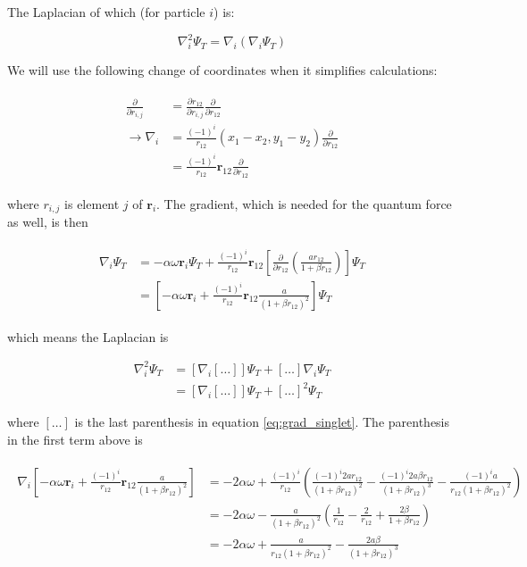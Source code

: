 \documentclass[english, a4paper]{article}
\newcommand{\bm}[1]{\mathbf{#1}}
\begin{document}
	The Laplacian of which (for particle $i$) is:
	
	\begin{equation}
	\nabla_i^2 \Psi_T = \nabla_i(\nabla_i\Psi_T)
	\end{equation}
	
	We will use the following change of coordinates when it simplifies calculations:
	
	\begin{align}
	\begin{split}
	\frac{\partial}{\partial r_{i,j}} &= \frac{\partial r_{12}}{\partial r_{i,j}}\frac{\partial}{\partial r_{12}}\\
	\rightarrow \nabla_i &= \frac{(-1)^i}{r_{12}}(x_1-x_2, y_1-y_2)\frac{\partial}{\partial r_{12}}\\
	&= \frac{(-1)^i}{r_{12}}\bm{r}_{12}\frac{\partial}{\partial r_{12}}
	\end{split}
	\label{eq:coord_change_nabla}
	\end{align}
	
	where $r_{i,j}$ is element $j$ of $\bm{r}_i$.
	The gradient, which is needed for the quantum force as well, is then
	
	\begin{align}
	\begin{split}
	\nabla_i\Psi_T &= -\alpha\omega\bm{r}_i\Psi_T + \frac{(-1)^i}{r_{12}}\bm{r}_{12}\left[\frac{\partial}{\partial r_{12}}\left(\frac{ar_{12}}{1+\beta r_{12}}\right)\right]\Psi_T\\
	&= \left[-\alpha\omega\bm{r}_i + \frac{(-1)^i}{r_{12}}\bm{r}_{12}\frac{a}{(1+\beta r_{12})^2}\right]\Psi_T
	\end{split}
	\label{eq:grad_singlet}
	\end{align} 
	
	which means the Laplacian is
	
	\begin{equation}
	\begin{split}
	\nabla_i^2\Psi_T &= \left[\nabla_i[\ldots]\right]\Psi_T + [\ldots]\nabla_i\Psi_T\\
	&= \left[\nabla_i[\ldots]\right]\Psi_T + [\ldots]^2\Psi_T
	\end{split}
	\end{equation}
	
	where $[\ldots]$ is the last parenthesis in equation \ref{eq:grad_singlet}. The parenthesis in the first term above is
	
	\begin{align}
	\begin{split}
	\nabla_i\left[-\alpha\omega\bm{r}_i + \frac{(-1)^i}{r_{12}}\bm{r}_{12}\frac{a}{(1+\beta r_{12})^2}\right] &= -2\alpha\omega + \frac{(-1)^i}{r_{12}}\left( \frac{(-1)^i2ar_{12}}{(1+\beta r_{12})^2} - \frac{(-1)^i2a\beta r_{12}}{(1+\beta r_{12})^3} - \frac{(-1)^ia}{r_{12}(1+\beta r_{12})^2}\right)\\
	&= -2\alpha\omega - \frac{a}{(1+\beta r_{12})^2}\left( \frac{1}{r_{12}} - \frac{2}{r_{12}} + \frac{2\beta}{1+\beta r_{12}}\right)\\
	&= -2\alpha\omega + \frac{a}{r_{12}(1+\beta r_{12})^2}- \frac{2a\beta}{(1+\beta r_{12})^3}
	\end{split}
	\end{align}
	
\end{document}
